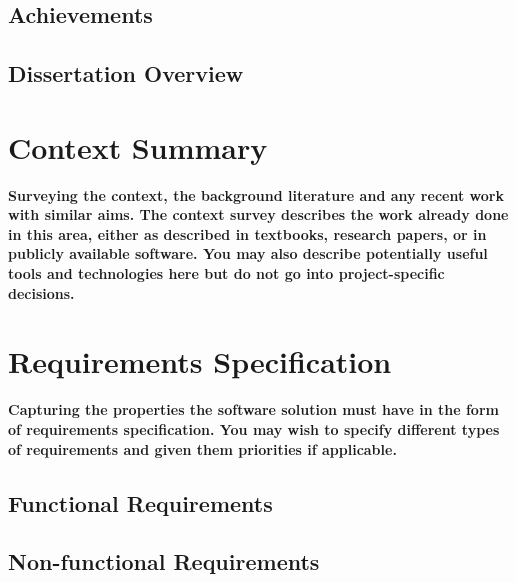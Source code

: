 \documentclass{article}
\begin{document}
\subsection{Achievements}

\subsection{Dissertation Overview}


\section{Context Summary}
\textbf{Surveying the context, the background literature and any
recent work with similar aims. The context survey
describes the work already done in this area, either as
described in textbooks, research papers, or in publicly
available software. You may also describe potentially
useful tools and technologies here but do not go into
project-specific decisions.} \\



\section{Requirements Specification}
\textbf{Capturing the properties the software solution must have
in the form of requirements specification. You may wish
to specify different types of requirements and given them
priorities if applicable.}
\subsection{Functional Requirements}
\subsection{Non-functional Requirements}
\end{document}
